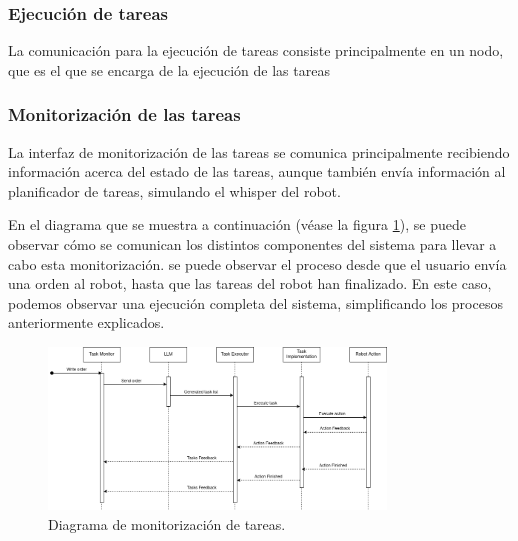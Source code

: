 \documentclass[../main.tex]{subfiles}
\begin{document}
\subsubsection{Ejecución de tareas}
La comunicación para la ejecución de tareas consiste principalmente en un nodo, que es el que se encarga de la ejecución de las tareas 

\subsubsection{Monitorización de las tareas}
La interfaz de monitorización de las tareas se comunica principalmente recibiendo información acerca del estado de las tareas, aunque también envía información al planificador de tareas, simulando el whisper del robot. 

En el diagrama que se muestra a continuación (véase la figura \ref{fig:diseno_monitoring}), se puede observar cómo se comunican los distintos componentes del sistema para llevar a cabo esta monitorización.
se puede observar el proceso desde que el usuario envía una orden al robot, hasta que las tareas del robot han finalizado. En este caso, podemos observar una ejecución completa del sistema, simplificando los procesos anteriormente explicados.

\begin{figure}[H]
    \centering
    \includegraphics[width=0.8\textwidth]{images/diseno_seq_monitor.png}
    \caption{Diagrama de monitorización de tareas.}\label{fig:diseno_monitoring}
\end{figure}
\end{document}
